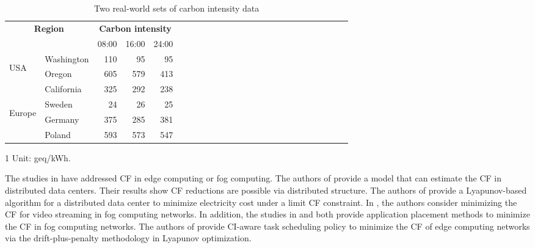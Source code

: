 \documentclass[conference, 10pt, ﬁnal, letterpaper, twocolumn]{IEEEtran}
\begin{document}
\begin{table}[h]
    \caption{\label{tab:data}Two real-world sets of carbon intensity data}
    \begin{center}
        \begin{threeparttable}[b]
            \begin{tabular}{*{5}{llrrr}}
                \toprule
                \midrule
                 \multicolumn{2}{c}{\multirow{2}{*}{\bf Region}} & \multicolumn{3}{c}{\bf Carbon intensity\tnote{1}}\\
                 \cmidrule(lr){3-5}
                \multicolumn{2}{c}{} & 08:00 & 16:00 & 24:00 \\
                \midrule
                 \multirow{3}{*}{\begin{turn}{90} USA \end{turn}} & Washington & 110 & 95  & 95\\
                 & Oregon & 605 & 579 & 413\\
                 & California & 325 & 292  & 238\\
                \midrule
                 \multirow{3}{*}{\begin{turn}{90} Europe \end{turn}} & Sweden & 24 & 26 & 25\\
                 & Germany & 375 & 285 & 381\\
                 & Poland & 593 & 573 & 547\\
                \midrule
                \bottomrule
            \end{tabular}
            
            \begin{tablenotes}
            	\footnotesize
            	\item[1]Unit: geq/kWh.
            \end{tablenotes}
        \end{threeparttable}
    \end{center}
\end{table}



The studies in \cite{van2012distributed, Rad2022Carbon, do2015proximal, aldossary2021towards, yang2022carbon} have addressed CF in edge computing or fog computing. The authors of \cite{van2012distributed} provide a model that can estimate the CF in distributed data centers. Their results show CF reductions are possible via distributed structure. The authors of \cite{Rad2022Carbon} provide a Lyapunov-based algorithm for a distributed data center to minimize electricity cost under a limit CF constraint. In \cite{do2015proximal}, the authors consider minimizing the CF for video streaming in fog computing networks. In addition, the studies in \cite{aldossary2021towards} and \cite{ahvar2021deca} both provide application placement methods to minimize the CF in fog computing networks. The authors of \cite{yang2022carbon} provide CI-aware task scheduling policy to minimize the CF of edge computing networks via the drift-plus-penalty methodology in Lyapunov optimization. 
\end{document}
